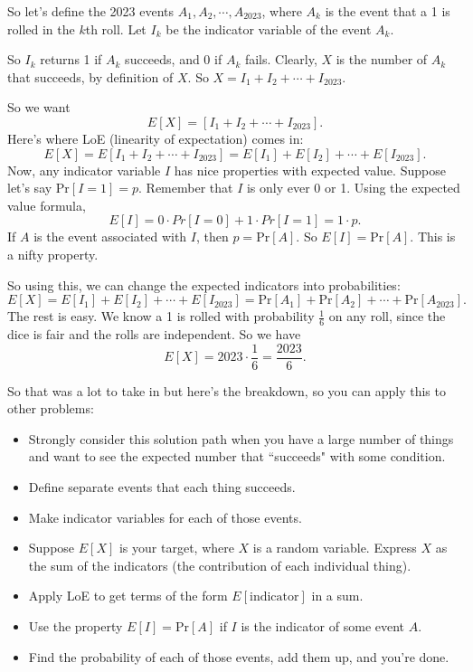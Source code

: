\documentclass[11pt]{scrartcl}
\begin{document}
So let's define the 2023 events $A_1, A_2, \cdots, A_{2023}$, where $A_k$ is the event that a 1 is rolled in the $k$th roll. Let $I_k$ be the indicator variable of the event $A_k$.

So $I_k$ returns 1 if $A_k$ succeeds, and 0 if $A_k$ fails. Clearly, $X$ is the number of $A_k$ that succeeds, by definition of $X$. So $X = I_1 + I_2 + \cdots + I_{2023}$.

So we want \[E[X] = [I_1 + I_2 + \cdots + I_{2023}].\] Here's where LoE (linearity of expectation) comes in: \[E[X] = E[I_1 + I_2 + \cdots + I_{2023}] = E[I_1] + E[I_2] + \cdots + E[I_{2023}].\] Now, any indicator variable $I$ has nice properties with expected value. Suppose let's say $\text{Pr}[I = 1] = p$. Remember that $I$ is only ever 0 or 1. Using the expected value formula, \[E[I] = 0 \cdot Pr[I = 0] + 1 \cdot Pr[I = 1] = 1 \cdot p.\] If $A$ is the event associated with $I$, then $p = \text{Pr}[A]$. So $E[I] = \text{Pr}[A]$. This is a nifty property.

So using this, we can change the expected indicators into probabilities: \[E[X] = E[I_1] + E[I_2] + \cdots + E[I_{2023}] = \text{Pr}[A_1] + \text{Pr}[A_2] + \cdots + \text{Pr}[A_{2023}].\] The rest is easy. We know a 1 is rolled with probability $\frac{1}{6}$ on any roll, since the dice is fair and the rolls are independent. So we have \[E[X] = 2023 \cdot \frac{1}{6} = \frac{2023}{6}.\]

\noindent
So that was a lot to take in but here's the breakdown, so you can apply this to other problems:

\begin{itemize}
\item Strongly consider this solution path when you have a large number of things and want to see the expected number that ``succeeds" with some condition.
\item Define separate events that each thing succeeds.
\item Make indicator variables for each of those events.
\item Suppose $E[X]$ is your target, where $X$ is a random variable. Express $X$ as the sum of the indicators (the  contribution of each individual thing).
\item Apply LoE to get terms of the form $E[\text{indicator}]$ in a sum.
\item Use the property $E[I] = \text{Pr}[A]$ if $I$ is the indicator of some event $A$.
\item Find the probability of each of those events, add them up, and you're done.
\end{itemize}
\end{document}

